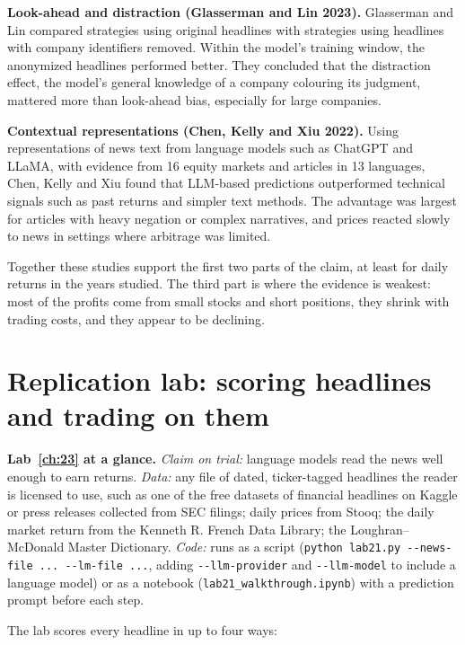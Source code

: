 \textbf{Look-ahead and distraction (Glasserman and Lin 2023).} Glasserman and Lin compared strategies using original headlines with strategies using headlines with company identifiers removed. Within the model's training window, the anonymized headlines performed better. They concluded that the distraction effect, the model's general knowledge of a company colouring its judgment, mattered more than look-ahead bias, especially for large companies.

\textbf{Contextual representations (Chen, Kelly and Xiu 2022).} Using representations of news text from language models such as ChatGPT and LLaMA, with evidence from 16 equity markets and articles in 13 languages, Chen, Kelly and Xiu found that LLM-based predictions outperformed technical signals such as past returns and simpler text methods. The advantage was largest for articles with heavy negation or complex narratives, and prices reacted slowly to news in settings where arbitrage was limited.

Together these studies support the first two parts of the claim, at least for daily returns in the years studied. The third part is where the evidence is weakest: most of the profits come from small stocks and short positions, they shrink with trading costs, and they appear to be declining.

\section{Replication lab: scoring headlines and trading on them}
\label{sec:23-lab}

\begin{callout}
\textbf{Lab~\ref{ch:23} at a glance.} \emph{Claim on trial:} language models read the news well enough to earn returns. \emph{Data:} any file of dated, ticker-tagged headlines the reader is licensed to use, such as one of the free datasets of financial headlines on Kaggle or press releases collected from SEC filings; daily prices from Stooq; the daily market return from the Kenneth R. French Data Library; the Loughran--McDonald Master Dictionary. \emph{Code:} runs as a script (\texttt{python lab21.py -{}-news-file ... -{}-lm-file ...}, adding \texttt{-{}-llm-provider} and \texttt{-{}-llm-model} to include a language model) or as a notebook (\texttt{lab21\_walkthrough.ipynb}) with a prediction prompt before each step.
\end{callout}

The lab scores every headline in up to four ways:

